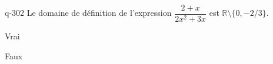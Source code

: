 \begin{truefalse}{q-302}
Le domaine de définition de l'expression $\dfrac{2+x}{2x^2+3x}$ est $\mathbb R \setminus \{0,-2/3\}$.
\item Vrai
\item* Faux
\end{truefalse}

